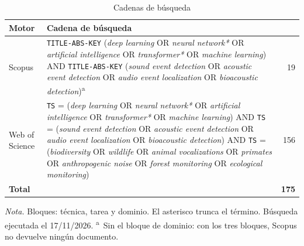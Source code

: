 \begin{table}[htbp]
    \centering
    \small
    \begin{threeparttable}
        \caption{Cadenas de búsqueda}
        \label{tab:cadenas}
        \begin{tabular}{@{}L{2.4cm}L{9.8cm}r@{}}
            \toprule
            \textbf{Motor}                  & \textbf{Cadena de búsqueda} &  \\
            \midrule
            Scopus                          &
            \texttt{TITLE-ABS-KEY} (\textit{deep learning} OR \textit{neural
                network*} OR \textit{artificial intelligence} OR
            \textit{transformer*} OR \textit{machine learning}) AND
            \texttt{TITLE-ABS-KEY} (\textit{sound event detection} OR
            \textit{acoustic event detection} OR \textit{audio event
                localization} OR \textit{bioacoustic detection})\textsuperscript{a} & 19 \\
            \addlinespace
            Web of Science                  &
            \texttt{TS} = (\textit{deep learning} OR \textit{neural network*} OR
            \textit{artificial intelligence} OR \textit{transformer*} OR
            \textit{machine learning}) AND \texttt{TS} = (\textit{sound event
                detection} OR \textit{acoustic event detection} OR \textit{audio
                event localization} OR \textit{bioacoustic detection}) AND
            \texttt{TS} = (\textit{biodiversity} OR \textit{wildlife} OR
            \textit{animal vocalizations} OR \textit{primates} OR
            \textit{anthropogenic noise} OR \textit{forest monitoring} OR
            \textit{ecological monitoring})   & 156                                         \\
            \midrule
            \textbf{Total}                  &                             & \textbf{175}  \\
            \bottomrule
        \end{tabular}
        \begin{tablenotes}[flushleft]
            \footnotesize
            \item \textit{Nota.} Bloques: técnica, tarea y dominio. El asterisco
            trunca el término. Búsqueda ejecutada el 17/11/2026.
            \textsuperscript{a}~Sin el bloque de dominio: con los tres bloques,
            Scopus no devuelve ningún documento.
        \end{tablenotes}
    \end{threeparttable}
\end{table}

